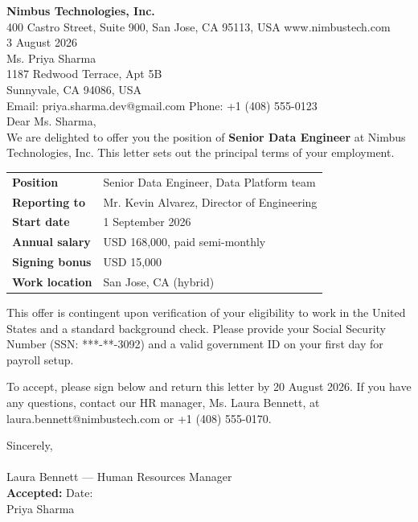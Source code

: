\documentclass[11pt,a4paper]{article}
\begin{document}
{\LARGE\bfseries\color{accent} Nimbus Technologies, Inc.}\\[0.2em]
{\small 400 Castro Street, Suite 900, San Jose, CA 95113, USA \quad www.nimbustech.com}\\[1em]

3 August 2026\\[0.8em]

Ms. Priya Sharma\\
1187 Redwood Terrace, Apt 5B\\
Sunnyvale, CA 94086, USA\\
Email: priya.sharma.dev@gmail.com \quad Phone: +1 (408) 555-0123\\[1em]

Dear Ms. Sharma,\\[0.6em]

We are delighted to offer you the position of \textbf{Senior Data Engineer} at Nimbus
Technologies, Inc. This letter sets out the principal terms of your employment.

\vspace{0.8em}
\begin{tabularx}{\linewidth}{@{}>{\bfseries}l X@{}}
Position & Senior Data Engineer, Data Platform team \\
Reporting to & Mr. Kevin Alvarez, Director of Engineering \\
Start date & 1 September 2026 \\
Annual salary & USD 168,000, paid semi-monthly \\
Signing bonus & USD 15,000 \\
Work location & San Jose, CA (hybrid) \\
\end{tabularx}

\vspace{0.8em}
This offer is contingent upon verification of your eligibility to work in the United
States and a standard background check. Please provide your Social Security Number
(SSN: ***-**-3092) and a valid government ID on your first day for payroll setup.

\vspace{0.8em}
To accept, please sign below and return this letter by 20 August 2026. If you have any
questions, contact our HR manager, Ms. Laura Bennett, at laura.bennett@nimbustech.com
or +1 (408) 555-0170.

\vspace{1.4em}
Sincerely,\\[1.2em]
\underline{\hspace{5cm}}\\
Laura Bennett — Human Resources Manager\\[1.6em]

\textbf{Accepted:} \underline{\hspace{5cm}} \quad Date: \underline{\hspace{3cm}}\\
Priya Sharma
\end{document}
